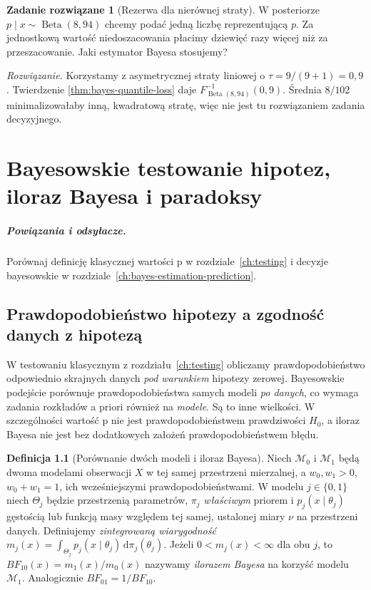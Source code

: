 \documentclass[11pt,a4paper,oneside]{report}
\numberwithin{equation}{chapter}
\theoremstyle{plain}
\theoremstyle{definition}
\newtheorem{definicja}{Definicja}[chapter]
\newtheorem{zadanie}{Zadanie rozwiązane}[chapter]
\theoremstyle{remark}
\newcommand{\dd}{\mathrm d}
\begin{document}
\begin{zadanie}[Rezerwa dla nierównej straty]
W posteriorze $p\mid x\sim\operatorname{Beta}(8,94)$ chcemy
podać jedną liczbę reprezentującą $p$. Za jednostkową wartość
niedoszacowania płacimy dziewięć razy więcej niż za przeszacowanie.
Jaki estymator Bayesa stosujemy?
\par\emph{Rozwiązanie.} Korzystamy z asymetrycznej straty
liniowej o $\tau=9/(9+1)=0{,}9$. Twierdzenie
\ref{thm:bayes-quantile-loss} daje $F_{\operatorname{Beta}(8,94)}^{-1}(0{,}9)$.
Średnia $8/102$ minimalizowałaby inną, kwadratową stratę,
więc nie jest tu rozwiązaniem zadania decyzyjnego.
\end{zadanie}

\chapter{Bayesowskie testowanie hipotez, iloraz Bayesa i paradoksy}
\label{ch:bayes-model-testing}
\paragraph{Powiązania i odsyłacze.} Porównaj definicję klasycznej wartości p w rozdziale~\ref{ch:testing} i decyzje bayesowskie w rozdziale~\ref{ch:bayes-estimation-prediction}.


\section{Prawdopodobieństwo hipotezy a zgodność danych z hipotezą}
W testowaniu klasycznym z rozdziału~\ref{ch:testing}
obliczamy prawdopodobieństwo odpowiednio skrajnych danych
\emph{pod warunkiem} hipotezy zerowej. Bayesowskie podejście
porównuje prawdopodobieństwa samych modeli \emph{po danych},
co wymaga zadania rozkładów a priori również na \emph{modele}.
Są to inne wielkości. W szczególności wartość p nie jest
prawdopodobieństwem prawdziwości $H_0$, a iloraz Bayesa nie
jest bez dodatkowych założeń prawdopodobieństwem błędu.

\begin{definicja}[Porównanie dwóch modeli i iloraz Bayesa]
\label{def:bayes-factor}
Niech $\mathcal M_0$ i $\mathcal M_1$ będą dwoma modelami
obserwacji $X$ w tej samej przestrzeni mierzalnej, a
$w_0,w_1>0$, $w_0+w_1=1$, ich wcześniejszymi
prawdopodobieństwami. W modelu $j\in\{0,1\}$
niech $\Theta_j$ będzie przestrzenią parametrów,
$\pi_j$ \emph{właściwym} priorem i
$p_j(x\mid\theta_j)$ gęstością lub funkcją masy
względem tej samej, ustalonej miary $\nu$ na przestrzeni
danych. Definiujemy \emph{zintegrowaną wiarygodność}
$m_j(x)=\int_{\Theta_j}p_j(x\mid\theta_j)\,\dd\pi_j(\theta_j)$.
Jeżeli $0<m_j(x)<\infty$ dla obu $j$, to
$BF_{10}(x)=m_1(x)/m_0(x)$ nazywamy \emph{ilorazem
Bayesa} na korzyść modelu $\mathcal M_1$. Analogicznie
$BF_{01}=1/BF_{10}$.
\end{definicja}
\end{document}
